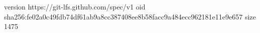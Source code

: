 version https://git-lfs.github.com/spec/v1
oid sha256:fe02a0c49fdb74df61ab9a8cc387408ee8b58facc9a484ecc962181e11e9e657
size 1475
